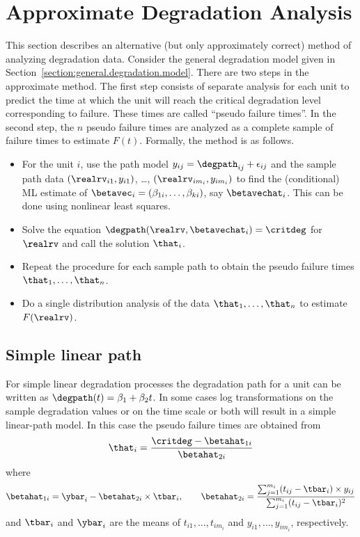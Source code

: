\section{Approximate Degradation Analysis}
\label{section:app.deg.anal}
This section describes an alternative (but only approximately
correct) method of analyzing degradation data.  Consider the general
degradation model given in
Section~\ref{section:general.degradation.model}.  There are two steps in
the approximate method.  The first step consists of separate
analysis for each unit to predict the time at which the unit will
reach the critical degradation level corresponding to failure. These
times are called ``pseudo failure times''. In the second step, the
$n$ pseudo failure times are analyzed as a complete sample of
failure times to estimate $F(t)$.  Formally, the method is as
follows.
\begin{itemize}
\item
For the unit $i$, use the path model $y_{ij} = \degpath_{ij} +
\epsilon_{ij}$ and the sample path data $(\realrv_{i1}, y_{i1})$,
\dots, $(\realrv_{im_{i}}, y_{im_{i}})$ to find the (conditional) ML
estimate of $\betavec_{i}=(\beta_{1i}, \dots , \beta_{ki})$, say
$\betavechat_{i}$. This can be done using nonlinear least squares.
\item
Solve the equation
$
\degpath(\realrv,\betavechat_{i})=\critdeg
$
for $\realrv$ and call the solution $\that_{i}$.
\item
Repeat the procedure for each sample path to obtain 
the pseudo failure times $\that_{1}, \dots, \that_{n}$.
\item
Do a single distribution analysis of the 
data $\that_{1}, \dots, \that_{n}$ to estimate $F(\realrv)$.
\end{itemize} 

\subsection{Simple linear path}
For simple linear degradation processes the degradation path for a unit can
be written as $\degpath(t) = \beta_{1} + \beta_{2} t$.
In some cases log
transformations on the sample degradation values or on the time scale or
both will result in a simple linear-path model. In this case the pseudo failure times are obtained from
\begin{displaymath}
\that_{i}=\frac{
\critdeg-\betahat_{1i}
	       }
 	       {
\betahat_{2i}
		}
\end{displaymath}
where 
\begin{displaymath}
\betahat_{1i}=\ybar_{i}-\betahat_{2i}\times \tbar_{i},
\quad \quad
\betahat_{2i}=
\frac{
\sum_{j=1}^{m_{i}} (t_{ij}-\tbar_{i}) \times y_{ij}
     }
     {
\sum_{j=1}^{m_{i}} (t_{ij}-\tbar_{i})^{2}
     }
\end{displaymath}
and $\tbar_{i}$ and $\ybar_{i}$ are the means of
$t_{i1}, \dots, t_{im_{i}}$ and 
$y_{i1}, \dots, y_{im_{i}}$, respectively.


